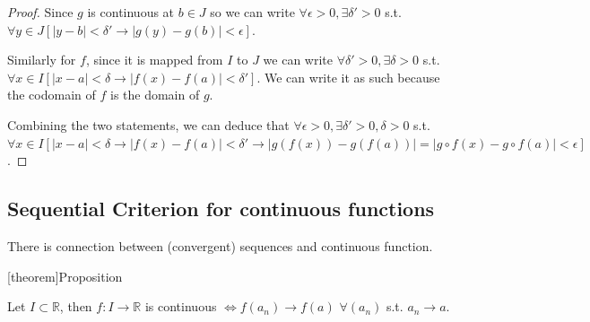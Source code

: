 \documentclass[12pt]{report}
\theoremstyle{definition}
\begin{document}
\begin{proof}
    Since $g$ is continuous at $b \in J$ so we can write
    $\forall \epsilon > 0, \exists \delta' > 0$ s.t.
    $\forall y \in J [|y-b|<\delta' \rightarrow |g(y)-g(b)|<\epsilon]$.

    Similarly for $f$, since it is mapped from $I$ to $J$ we can write
    $\forall \delta' > 0, \exists \delta > 0$ s.t. 
    $\forall x \in I [|x-a|<\delta \rightarrow |f(x)-f(a)|<\delta']$.
    We can write it as such because the codomain of $f$ is the domain of $g$.

    Combining the two statements, we can deduce that
    $\forall \epsilon > 0, \exists \delta' > 0, \delta > 0$ s.t.
    $\forall x \in I [|x-a|<\delta \rightarrow |f(x)-f(a)|<\delta' 
    \rightarrow |g(f(x))-g(f(a))|=|g\circ f(x) - g\circ f(a)|<\epsilon]$.
\end{proof} 

\subsection{Sequential Criterion for continuous functions}

There is connection between (convergent) sequences and continuous function.

[theorem]{Proposition}
\begin{continuous function and sequences}
    Let $I\subset \mathbb{R}$, then $f:I\rightarrow{}\mathbb{R}$ is continuous
    $\iff f(a_n) \rightarrow{} f(a)$ $\forall (a_n)$ s.t. $a_n \rightarrow{}a$.
\end{continuous function and sequences}
\end{document}
